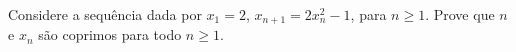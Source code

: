 Considere a sequência dada por $x_1 = 2$, $x_{n+1} = 2x_n^2-1$, para $n \ge 1$. Prove que $n$ e $x_n$ são coprimos para todo $n \ge 1$.

